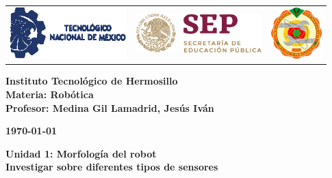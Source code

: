 \begin{titlepage}
	\centering
	\begin{tabular}{@{}p{} p{} p{}@{}}
		\includegraphics[height=2cm]{tecnm} & 
		\centering \includegraphics[height=1.5cm]{SEP} & 
		\raggedleft \includegraphics[height=2cm]{ith.jpg} \\
	\end{tabular}
	
	\vspace{2em}
	
	\noindent
	\begin{minipage}[t]{0.48\textwidth}
		\raggedright
		\small \textbf{%
			Instituto Tecnológico de Hermosillo\\
			Materia: Robótica\\
			Profesor: Medina Gil Lamadrid, Jesús Iván%
		}
	\end{minipage}%
	\hfill
	\begin{minipage}[t]{0.48\textwidth}
		\raggedleft
		\small \textbf{\today}
	\end{minipage}
	
	\vspace{2em}
	
	{\large \textbf{Unidad 1: Morfología del robot}}\\
	{\Huge \textbf{Investigar sobre diferentes tipos de sensores
	}}
		
	\vspace{1em}
	

\end{titlepage}
